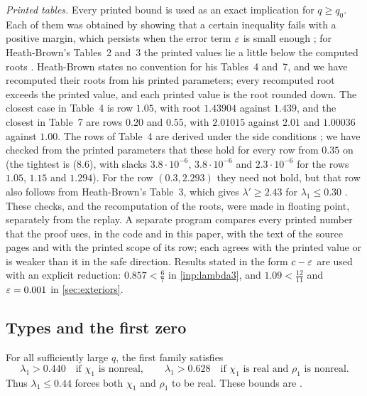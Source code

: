\emph{Printed tables.} Every printed bound is used as an exact implication for $q\ge q_0$. Each
of them was obtained by showing that a certain inequality fails with a positive margin, which
persists when the error term $\varepsilon$ is small enough \cite[p.~43, p.~44 and footnote~2 on
p.~45]{Xylouris2011nullstellen}; for Heath-Brown's Tables~2 and~3 the printed values lie a little below
the computed roots \cite[\S8]{HeathBrown1992zero}. Heath-Brown states no convention for his
Tables~4 and~7, and we have recomputed their roots from his printed parameters; every recomputed
root exceeds the printed value, and each printed value is the root rounded down. The closest case
in Table~4 is row $1.05$, with root $1.43904$ against $1.439$, and the closest in Table~7 are rows
$0.20$ and $0.55$, with $2.01015$ against $2.01$ and $1.00036$ against $1.00$. The
rows of Table~4 are derived under the side conditions \cite[(8.6), (8.8)]{HeathBrown1992zero}; we have
checked from the printed parameters that these hold for every row from $0.35$ on (the tightest is
(8.6), with slacks $3.8\cdot10^{-6}$, $3.8\cdot10^{-6}$ and $2.3\cdot10^{-6}$ for the rows $1.05$, $1.15$ and
$1.294$). For the row $(0.3,2.293)$ they need not hold, but that row also follows from Heath-Brown's
Table~3, which gives $\lambda'\ge2.43$ for $\lambda_1\le0.30$ \cite[\S8]{HeathBrown1992zero}. These checks, and the
recomputation of the roots, were made in floating point, separately from the replay. A separate
program compares every printed number that the proof uses, in the code and in this paper, with
the text of the source pages and with the printed scope of its row; each agrees with the printed
value or is weaker than it in the safe direction.
Results stated in the form $c-\varepsilon$ are used with an explicit reduction: $0.857<\frac67$ in
\cref{inp:lambda3}, and $1.09<\frac{12}{11}$ and $\varepsilon=0.001$ in \cref{sec:exteriors}.

\subsection{Types and the first zero}

\begin{proposition}\label{prop:firstlower}
For all sufficiently large $q$, the first family satisfies
\[
  \lambda_1>0.440\quad\text{if }\chi_1\text{ is nonreal},\qquad
  \lambda_1>0.628\quad\text{if }\chi_1\text{ is real and }\rho_1\text{ is nonreal}.
\]
Thus $\lambda_1\le0.44$ forces both $\chi_1$ and $\rho_1$ to be real.
These bounds are \cite[Lemma~4.5 and Table~11, pp.~60--61]{Xylouris2011nullstellen}.
\end{proposition}

